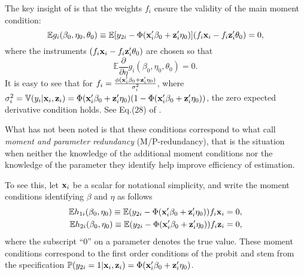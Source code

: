 \documentclass[11pt]{article}
\begin{document}
The key insight of \cite{bellonichernozhukovwei2016} is that the weights $f_i$ ensure the validity of the main moment condition: 
\begin{equation}\label{eq:no}
    \mathbb{E} g_i(\beta_0, \eta_0, \theta_0) \equiv \mathbb{E} [y_{2i} - \Phi(\mathbf{x}'_i\beta_0 +\mathbf{z}_i'\eta_0)](f_i\mathbf{x}_i - f_i\mathbf{z}_i'\theta_0) = 0, 
\end{equation}
where the instruments $(f_i\mathbf{x}_i - f_i\mathbf{z}_i'\theta_0)$ are chosen so that   
\[\mathbb{E}\frac{\partial}{\partial \eta} g_i(\beta_0, \eta_0, \theta_0) = 0.\]
It is easy to see that for $f_i = \frac{\phi(\mathbf{x}'_i\beta_0 +\mathbf{z}_i'\eta_0)}{\sigma_i^2}$, where $\sigma_i^2=\mathbb{V}(y_i|\mathbf{x}_i, \mathbf{z}_i)=\Phi(\mathbf{x}_i'{\beta}_0 + \mathbf{z}_i'{\eta}_0)
	(1 - \Phi(\mathbf{x}_i'{\beta}_0 + \mathbf{z}_i'{\eta}_0))$, the zero expected derivative condition holds. See Eq.(28) of \cite{bellonichernozhukovwei2016}.

What has not been noted is that these conditions correspond to what \cite{prokhorov/schmidt:09} call \emph{moment and parameter redundancy} (M/P-redundancy), that is the situation when neither the knowledge of the additional moment conditions nor the knowledge of the parameter they identify help improve efficiency of estimation. 


To see this, let $\mathbf{x}_i$ be a scalar for notational simplicity, and write the moment conditions identifying $\beta$ and $\eta$ as follows
\begin{eqnarray}\label{eq:gmm1}
\mathbb{E}h_{1i}(\beta_0, \eta_0) \equiv \mathbb{E}(y_{2i}-\Phi(\mathbf{x}_i' \beta_0 + \mathbf{z}_i'\eta_0) )f_i\mathbf{x}_i = 0,\\\label{eq:gmm2}
\mathbb{E}h_{2i}(\beta_0, \eta_0) \equiv \mathbb{E}(y_{2i}-\Phi(\mathbf{x}_i' \beta_0 + \mathbf{z}_i'\eta_0) )f_i\mathbf{z}_i = 0,
\end{eqnarray}
where the subscript ``0'' on a parameter denotes the true value. 
These moment conditions correspond to the first order conditions of the probit and stem from the specification $\mathbb{P}(y_{2i}=1|\mathbf{x}_i, \mathbf{z}_i) = \Phi(\mathbf{x}'_i\beta_0 +\mathbf{z}_i'\eta_0)$. %
\end{document}
